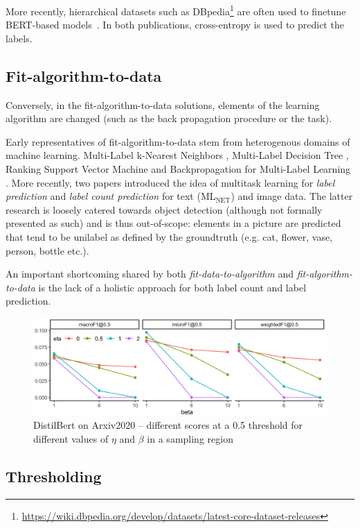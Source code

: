 More recently, hierarchical datasets such as
DBpedia\footnote{\url{https://wiki.dbpedia.org/develop/datasets/latest-core-dataset-releases}}
are often used to finetune BERT-based models~\cite{XLNet, bigBird}. In both
publications, cross-entropy is used to predict the labels.

\subsection{Fit-algorithm-to-data}
Conversely, in the fit-algorithm-to-data solutions, elements of the learning
algorithm are changed (such as the back propagation procedure or the task).

Early representatives of fit-algorithm-to-data stem from heterogenous domains
of machine learning. Multi-Label k-Nearest Neighbors \cite{ML-KNN},
Multi-Label Decision Tree \cite{ML-DT}, Ranking Support Vector Machine
\cite{multilabelSVM} and Backpropagation for Multi-Label Learning
\cite{multilabelBackprop}. More recently, two papers introduced the idea of
multitask learning for \emph{label prediction} and \emph{label count
prediction} for text (ML\(_{\text{NET}}\)) \cite{multitaskLabel} and image
\cite{multitaskLabelImages, tencent} data. The latter research is loosely
catered towards object detection (although not formally presented as such) and
is thus out-of-scope: elements in a picture are predicted that tend to be
unilabel as defined by the groundtruth (e.g. cat, flower, vase, person, bottle
etc.).

An important shortcoming shared by both \emph{fit-data-to-algorithm} and
\emph{fit-algorithm-to-data} is the lack of a holistic approach for both label
count and label prediction.

\begin{figure}[t!]
\centering
\includegraphics[width=.9\linewidth]{./images/betaEtaResized.png}
\caption{\label{fig:betaEta}
DistilBert on Arxiv2020 – different scores at a 0.5 threshold for different values of $\eta$ and $\beta$ in a sampling region}
\end{figure}

\subsection{Thresholding}
\label{subsec:thresh}

